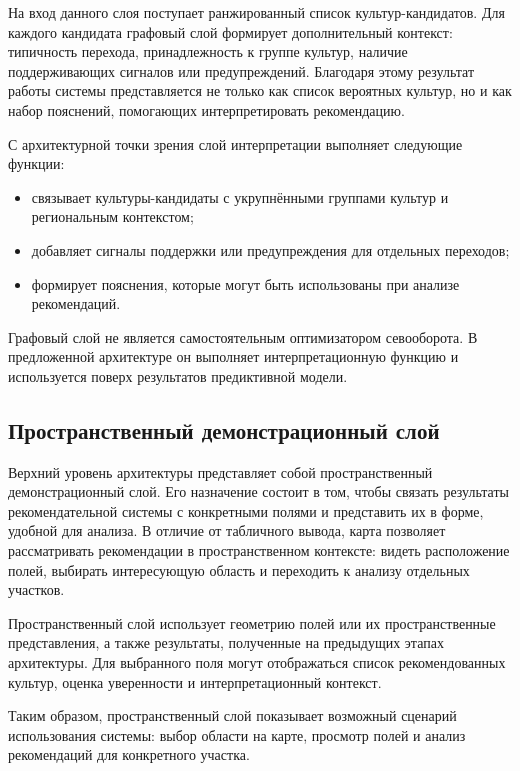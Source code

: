 На вход данного слоя поступает ранжированный список культур-кандидатов. Для каждого кандидата графовый слой формирует
дополнительный контекст: типичность перехода, принадлежность к группе культур, наличие поддерживающих сигналов или
предупреждений. Благодаря этому результат работы системы представляется не только как список вероятных культур, но и
как набор пояснений, помогающих интерпретировать рекомендацию.

С архитектурной точки зрения слой интерпретации выполняет следующие функции:

\begin{itemize}
\tightlist
\item
  связывает культуры-кандидаты с укрупнёнными группами культур и региональным контекстом;
\item
  добавляет сигналы поддержки или предупреждения для отдельных переходов;
\item
  формирует пояснения, которые могут быть использованы при анализе рекомендаций.
\end{itemize}

Графовый слой не является самостоятельным оптимизатором севооборота. В предложенной архитектуре он выполняет
интерпретационную функцию и используется поверх результатов предиктивной модели.

\subsection{Пространственный демонстрационный слой}

Верхний уровень архитектуры представляет собой пространственный демонстрационный слой. Его назначение состоит в том,
чтобы связать результаты рекомендательной системы с конкретными полями и представить их в форме, удобной для анализа.
В отличие от табличного вывода, карта позволяет рассматривать рекомендации в пространственном контексте: видеть
расположение полей, выбирать интересующую область и переходить к анализу отдельных участков.

Пространственный слой использует геометрию полей или их пространственные представления, а также результаты, полученные
на предыдущих этапах архитектуры. Для выбранного поля могут отображаться список рекомендованных культур, оценка
уверенности и интерпретационный контекст.

Таким образом, пространственный слой показывает возможный сценарий использования системы: выбор области на карте,
просмотр полей и анализ рекомендаций для конкретного участка.

